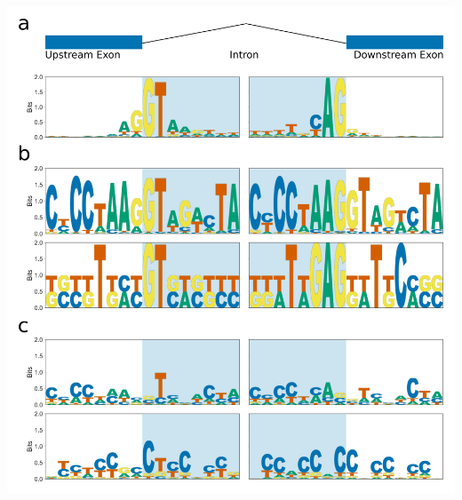 \documentclass[12pt,a4paper,]{report}
\let\origfigure=\figure
\let\endorigfigure=\endfigure
\renewenvironment{figure}[1][2] {
    \expandafter\origfigure\expandafter[H]
} {
    \endorigfigure
}
\begin{document}
\newpage

\begin{figure}[htbp]
\centering
\includegraphics[width=\textwidth,height=562pt,keepaspectratio]{chapter_6/figures/splice_site_sequence_logo.png}
\caption[Splice junction motifs for EXT9 and LRX3]{\textbf{Splice   junction   motifs   for   EXT9   and   LRX3}   Sequence   logo   plots   showing   consensus   splice   site   sequences   around   donor   (left   panels)   and   acceptor   (right   panels)   splice   sites.   Putative   intronic   sequences   are   shown   on   shaded   blue   background.   \textbf{a)}   Splice   junction   consensus   sequence   logo   for   Arabidopsis,   calculated   from   junctions   in   the   Araport11   annotation.   \textbf{b)}   Splice   junction   consensus   sequence   logo   produced   from   \textbf{de   novo}   assembled   transcripts   (Li   et   al. 2016)   for   EXT9   and   LRX3.   \textbf{c)}   Splice   junction   consensus   sequence   logo   produced   from   unique   donor/acceptor   pairs   identified   from   spliced   reads   on   EXT9   and   LRX3.   \label{splice_junct}}
\end{figure}
\end{document}
